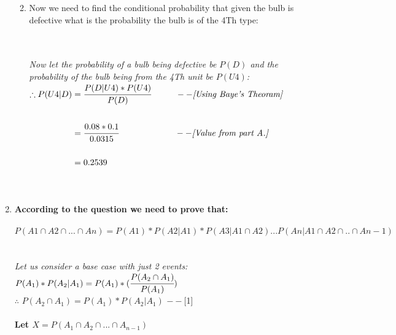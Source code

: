 \documentclass{article}
\begin{document}
\begin{enumerate}
\begin{enumerate}


 \newpage
\item Now we need to find the conditional probability that given the bulb is defective what is the probability the bulb is of the 4Th type:\\\\\

\textit{Now let the probability of a bulb being defective be $P(D)$ and the probability of the bulb being from the 4Th unit be $P(U4)$: }\\

$\begin{aligned}
    \therefore P(U4|D) &= \cfrac{P(D|U4) * P(U4)}{P(D)}\hspace{10mm}     --\textit{[Using Baye's Theoram]}\\\\
    &= \cfrac{0.08 * 0.1}{0.0315}\hspace{23mm}     --\textit{[Value from part A.]}\\\\
    &= 0.2539\\\\\\
\end{aligned}$


\end{enumerate}

\newpage

\item \large \textbf{According to the question we need to prove that: }\\\\
$P(A1 \cap A2 \cap ... \cap An) = P(A1)*P(A2|A1)*P(A3|A1 \cap A2)...P(An|A1 ∩ A2 ∩ .. ∩ An−1)$ \\\\\\


\textit{Let us consider a base case with just 2 events: }\\

$P(A_{1})* P(A_{2}|A_{1}) = P(A_{1}) * (\cfrac{P(A_{2} \cap A_{1})}{P(A_{1})})$\\

$\therefore$ $P(A_{2} \cap A_{1}) = P(A_{1})* P(A_{2}|A_{1})$\hspace{10mm}     $--$[1]\\\\

\textbf{Let $X = P(A_{1} \cap A_{2} \cap ... \cap A_{n-1})$}\\\\


\end{enumerate}
\end{document}
